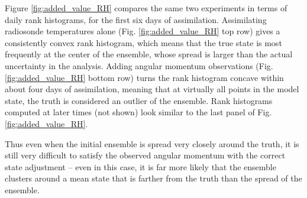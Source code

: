 Figure \ref{fig:added_value_RH} compares the same two experiments in terms of daily rank histograms, for the first six days of assimilation.  
Assimilating radiosonde temperatures alone (Fig. \ref{fig:added_value_RH} top row) gives a consistently convex rank histogram, which means that the true state is most frequently at the center of the ensemble, whose spread is larger than the actual uncertainty in the analysis.  
Adding angular momentum observations (Fig. \ref{fig:added_value_RH} bottom row) turns the rank histogram concave within about four days of assimilation, meaning that at virtually all points in the model state, the truth is considered an outlier of the ensemble. 
Rank histograms computed at later times (not shown) look similar to the last panel of Fig. \ref{fig:added_value_RH}.  

Thus even when the initial ensemble is spread very closely around the truth, it is still very difficult to satisfy the observed angular momentum with the correct state adjustment -- even in this case, it is far more likely that the ensemble clusters around a mean state that is farther from the truth than the spread of the ensemble.  

